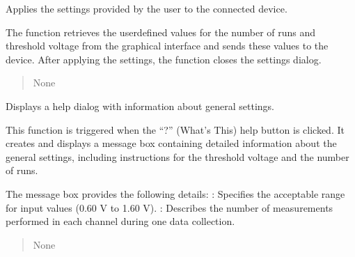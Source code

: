 \documentclass[letterpaper,10pt,english]{sphinxmanual}
\begin{document}
\begin{fulllineitems}
\begin{fulllineitems}
\label{\detokenize{generalsettings:generalsettings.GeneralSettingsWindow.setsettings}}
\pysigstartsignatures
{}
\pysigstopsignatures
\sphinxAtStartPar
Applies the settings provided by the user to the connected device.

\sphinxAtStartPar
The function retrieves the user\sphinxhyphen{}defined values for the number of runs and threshold voltage 
from the graphical interface and sends these values to the device. After applying the settings, 
the function closes the settings dialog.
\begin{quote}\begin{description}
\sphinxAtStartPar
None

\end{description}\end{quote}

\end{fulllineitems}


\begin{fulllineitems}
\label{\detokenize{generalsettings:generalsettings.GeneralSettingsWindow.showHelp}}
\pysigstartsignatures
{}
\pysigstopsignatures
\sphinxAtStartPar
Displays a help dialog with information about general settings.

\sphinxAtStartPar
This function is triggered when the “?” (What’s This) help button is clicked. It creates and displays a message box containing detailed information about the general settings, including instructions for the threshold voltage and the number of runs.

\sphinxAtStartPar
The message box provides the following details:
\sphinxhyphen{} : Specifies the acceptable range for input values (0.60 V to 1.60 V).
\sphinxhyphen{} : Describes the number of measurements performed in each channel during one data collection.
\begin{quote}\begin{description}
\sphinxAtStartPar
None

\end{description}\end{quote}


\end{fulllineitems}
\end{fulllineitems}
\end{document}
